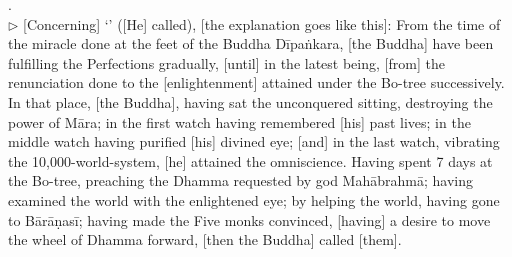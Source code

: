 .  \\
$\triangleright$  [Concerning] `' ([He] called), [the explanation goes like this]: From the time of the miracle done at the feet of the Buddha D\=ipa\.nkara, [the Buddha] have been fulfilling the Perfections gradually, [until] in the latest being, [from] the renunciation done to the [enlightenment] attained under the Bo-tree successively.  In that place, [the Buddha], having sat the unconquered sitting, destroying the power of M\=ara; in the first watch having remembered [his] past lives; in the middle watch having purified [his] divined eye; [and] in the last watch, vibrating the 10,000-world-system, [he] attained the omniscience.  Having spent 7 days at the Bo-tree, preaching the Dhamma requested by god Mah\=abrahm\=a; having examined the world with the enlightened eye; by helping the world, having gone to B\=ar\=a\d nas\=i; having made the Five monks convinced, [having] a desire to move the wheel of Dhamma forward, [then the Buddha] called [them].\\
